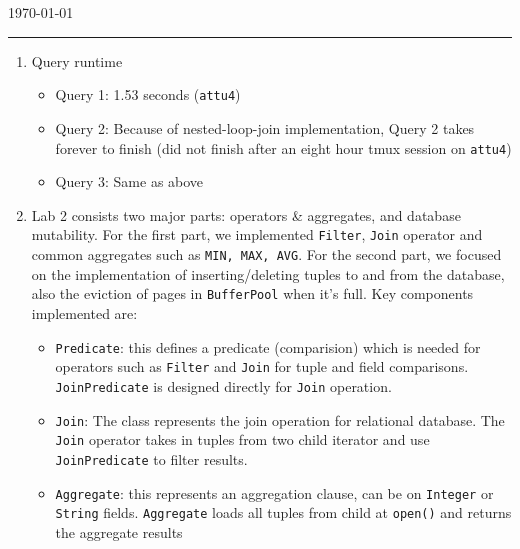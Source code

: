 \documentclass[10pt]{myland}
\begin{document}
\begin{center}
	{\Large {}} \\
	\vspace{.05in}
    \quad{}\\
	\vspace{.05in}
    \today \\
\end{center}
\vspace{.15in} \hrule \vspace{0.5em}%


\begin{enumerate}[label=\textbf{\arabic*.}, listparindent=0.0em, itemsep=1em]
    \item Query runtime
        \begin{itemize}
            \item Query 1: 1.53 seconds (\texttt{attu4})
            \item Query 2: Because of nested-loop-join implementation, Query 2 takes forever to finish (did not finish
                after an eight hour tmux session on \texttt{attu4})
            \item Query 3: Same as above
        \end{itemize}
	\item
	Lab 2 consists two major parts: operators \& aggregates, and database mutability. For the first part, we implemented
    \texttt{Filter}, \texttt{Join} operator and common aggregates such as \texttt{MIN, MAX, AVG}. For the second part,
    we focused on the implementation of inserting/deleting tuples to and from the database, also the eviction of pages
    in \texttt{BufferPool} when it's full. Key components implemented are:
	\begin{itemize}
        \item \texttt{Predicate}: this defines a predicate (comparision) which is needed for operators such as
            \texttt{Filter} and \texttt{Join} for tuple and field comparisons. \texttt{JoinPredicate} is designed directly
            for \texttt{Join} operation.
		\item \texttt{Join}: The class represents the join operation for relational database. The \texttt{Join} operator
            takes in tuples from two child iterator and use \texttt{JoinPredicate} to filter results.
		\item \texttt{Aggregate}: this represents an aggregation clause, can be on \texttt{Integer} or \texttt{String}
            fields. \texttt{Aggregate} loads all tuples from child at \texttt{open()} and returns the aggregate results

\end{itemize}
\end{enumerate}
\end{document}
